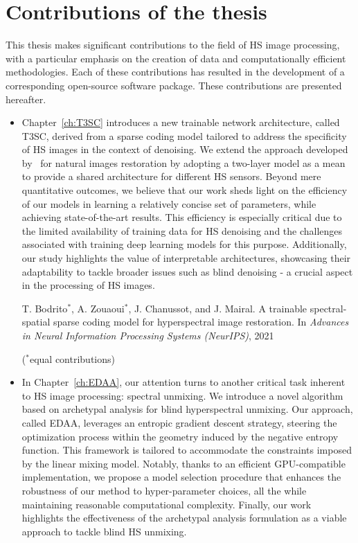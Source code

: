 \section{Contributions of the thesis}
\label{sec:contrib}

This thesis makes significant contributions to the field of HS image processing, with a particular emphasis on the creation of data and computationally efficient methodologies.
Each of these contributions has resulted in the development of a corresponding open-source software package.
These contributions are presented hereafter.

\begin{itemize}
    \item Chapter~\ref{ch:T3SC} introduces a new trainable network architecture, called T3SC, derived from a sparse coding model tailored to address the specificity of HS images in the context of denoising.
    We extend the approach developed by~\cite{lecouat_fully_2020} for natural images restoration by adopting a two-layer model as a mean to provide a shared architecture for different HS sensors.
    Beyond mere quantitative outcomes, we believe that our work sheds light on the efficiency of our models in learning a relatively concise set of parameters, while achieving state-of-the-art results.
    This efficiency is especially critical due to the limited availability of training data for HS denoising and the challenges associated with training deep learning models for this purpose.
    Additionally, our study highlights the value of interpretable architectures, showcasing their adaptability to tackle broader issues such as blind denoising - a crucial aspect in the processing of HS images. 

    \begin{tcolorbox}[colback=gray!5!white,colframe=gray!75!black]
        T. Bodrito$^{*}$, A. Zouaoui$^{*}$, J. Chanussot, and J. Mairal. A trainable spectral-spatial sparse coding model for hyperspectral image restoration. In \emph{Advances in Neural Information Processing Systems (NeurIPS)}, 2021

        \vspace{1em}

        ($^{*}$equal contributions)
    \end{tcolorbox}

    \item In Chapter~\ref{ch:EDAA}, our attention turns to another critical task inherent to HS image processing: spectral unmixing. 
    We introduce a novel algorithm based on archetypal analysis for blind hyperspectral unmixing. 
    Our approach, called EDAA, leverages an entropic gradient descent strategy, steering the optimization process within the geometry induced by the negative entropy function.
    This framework is tailored to accommodate the constraints imposed by the linear mixing model.
    Notably, thanks to an efficient GPU-compatible implementation, we propose a model selection procedure that enhances the robustness of our method to hyper-parameter choices, all the while maintaining reasonable computational complexity.
    Finally, our work highlights the effectiveness of the archetypal analysis formulation as a viable approach to tackle blind HS unmixing.
    

\end{itemize}
